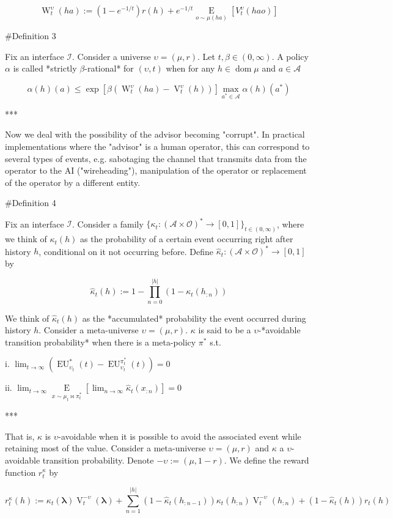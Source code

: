 \documentclass[a4paper]{article}
\DeclareMathOperator{\Dom}{dom}
\newcommand{\E}[1]{\underset{#1}{\operatorname{E}}}
\newcommand{\Estr}{\boldsymbol{\lambda}}
\newcommand{\Abs}[1]{\lvert #1 \rvert}
\newcommand{\Ob}{\mathcal{O}}
\newcommand{\A}{\mathcal{A}}
\newcommand{\I}{\mathcal{I}}
\newcommand{\FH}{(\A \times \Ob)^*}
\newcommand{\V}{\operatorname{V}}
\newcommand{\W}{\operatorname{W}}
\newcommand{\EU}{\operatorname{EU}}
\begin{document}
$$\W_t^\upsilon(ha):=(1-e^{-1/t})r(h)+e^{-1/t}\E{o \sim \mu(ha)}[V_t^\upsilon(hao)]$$

\#Definition 3

Fix an interface $\I$. Consider a universe $\upsilon=(\mu,r)$. Let $t,\beta \in (0,\infty)$. A policy $\alpha$ is called *strictly $\beta$-rational* for $(\upsilon,t)$ when for any $h \in \Dom{\mu}$ and $a \in \A$

$$\alpha(h)(a) \leq \exp{[\beta(\W^{\upsilon}_t(ha)-\V^\upsilon_t(h))]} \max_{a^* \in \A} \alpha(h)(a^*)$$

***

Now we deal with the possibility of the advisor becoming "corrupt". In practical implementations where the "advisor" is a human operator, this can correspond to several types of events, e.g. sabotaging the channel that transmits data from the operator to the AI ("wireheading"), manipulation of the operator or replacement of the operator by a different entity.

\#Definition 4

Fix an interface $\I$. Consider a family $\{\kappa_t: \FH \rightarrow [0,1]\}_{t \in (0,\infty)}$, where we think of $\kappa_t(h)$ as the probability of a certain event occurring right after history $h$, conditional on it not occurring before. Define $\hat{\kappa}_t: \FH \rightarrow [0,1]$ by

$$\hat{\kappa}_t(h):= 1-\prod_{n = 0}^{\Abs{h}} (1 - \kappa_t(h_{:n}))$$

We think of $\hat{\kappa}_t(h)$ as the *accumulated* probability the event occurred during history $h$. Consider a meta-universe $\upsilon=(\mu,r)$. $\kappa$ is said to be a $\upsilon$-*avoidable transition probability* when there is a meta-policy $\pi^*$ s.t.

i. $\lim_{t \rightarrow \infty} {(\EU_{\upsilon_t}^{*}(t)-\EU_{\upsilon_t}^{\pi^*_t}(t))} = 0$

ii. $\lim_{t \rightarrow \infty} \E{x \sim \mu_t\bowtie\pi^*_t}[\lim_{n \rightarrow \infty} \hat{\kappa}_t(x_{:n})] = 0$

***

That is, $\kappa$ is $\upsilon$-avoidable when it is possible to avoid the associated event while retaining most of the value. Consider a meta-universe $\upsilon=(\mu,r)$ and $\kappa$ a $\upsilon$-avoidable transition probability. Denote $-\upsilon:=(\mu,1-r)$. We define the reward function $r^\kappa_t$ by

$$r^\kappa_t(h):=\kappa_t(\Estr) \V^{-\upsilon}_t(\Estr)+\sum_{n=1}^{\Abs{h}} (1-\hat{\kappa}_t(h_{:n-1}))\kappa_t(h_{:n}) \V^{-\upsilon}_t(h_{:n})+(1-\hat{\kappa}_t(h))r_t(h)$$
\end{document}
